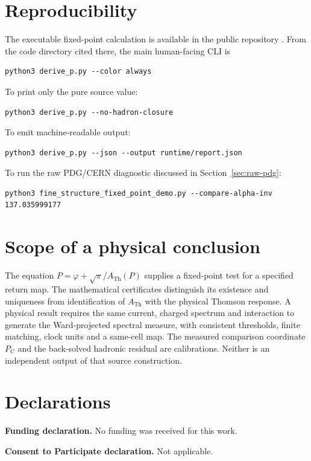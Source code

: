 \documentclass[11pt]{article}
\theoremstyle{remark}
\newcommand{\ATh}{A_{\mathrm{Th}}}
\newcommand{\Ppub}{P_{\mathrm C}}
\begin{document}



\section{Reproducibility}

The executable fixed-point calculation is available in the public repository
\cite{oph-code}. From the code directory cited there, the main human-facing CLI is
\begin{verbatim}
python3 derive_p.py --color always
\end{verbatim}
To print only the pure source value:
\begin{verbatim}
python3 derive_p.py --no-hadron-closure
\end{verbatim}
To emit machine-readable output:
\begin{verbatim}
python3 derive_p.py --json --output runtime/report.json
\end{verbatim}
To run the raw PDG/CERN diagnostic discussed in Section~\ref{sec:raw-pdg}:
\begin{verbatim}
python3 fine_structure_fixed_point_demo.py --compare-alpha-inv 137.035999177
\end{verbatim}


\section{Scope of a physical conclusion}

The equation $P=\varphi+\sqrt\pi/\ATh(P)$ supplies a fixed-point test for a
specified return map. The mathematical certificates distinguish its
existence and uniqueness from identification of $\ATh$ with the physical
Thomson response. A physical result requires the same current, charged
spectrum and interaction to generate the Ward-projected spectral measure,
with consistent thresholds, finite matching, clock units and a same-cell
map. The measured comparison coordinate $\Ppub$ and the back-solved
hadronic residual are calibrations. Neither is an independent output of
that source construction.

\section*{Declarations}

\textbf{Funding declaration.} No funding was received for this work.

\textbf{Consent to Participate declaration.} Not applicable.
\end{document}
